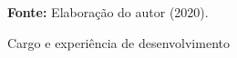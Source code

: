 \begin{figure}[ht!]
\centering

\caption{\textmd{Cargo e experiência de desenvolvimento}}
\label{fig:experienciacargo}

\par\medskip\textbf{Fonte:} Elaboração do autor (2020). \par\medskip

\end{figure}

